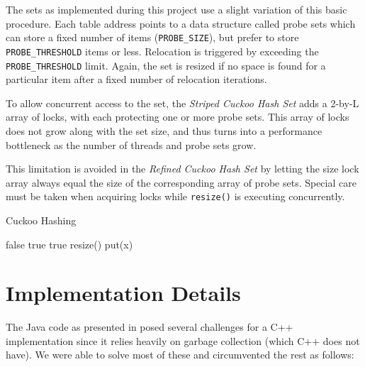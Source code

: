 \documentclass[a4paper,10pt]{article}
\begin{document}
The sets as implemented during this project use a slight variation of this
basic procedure. Each table address points to a data structure called probe sets
which can store a fixed number of items (\lstinline|PROBE_SIZE|), but prefer
to store \lstinline|PROBE_THRESHOLD| items or less. Relocation is triggered
by exceeding the \lstinline|PROBE_THRESHOLD| limit. Again, the set is resized
if no space is found for a particular item after a fixed number of relocation
iterations.

To allow concurrent access to the set, the \emph{Striped Cuckoo Hash Set}
adds a 2-by-L array of locks, with each protecting one or more probe sets.
This array of locks does not grow along with the set size, and thus turns into
a performance bottleneck as the number of threads and probe sets grow.

This limitation is avoided in the \emph{Refined Cuckoo Hash Set} by letting
the size lock array always equal the size of the corresponding array of probe
sets. Special care must be taken when acquiring locks while
\lstinline|resize()| is executing concurrently.

\begin{algorithm}
\caption{Cuckoo Hashing}
\label{alg:cuckooHashing}
\begin{algorithmic}[5]
		\State \Return false
	\EndIf
			\State \Return true
			\State \Return true
		\EndIf
	\EndFor
	\State resize()
	\State put(x)
\EndFunction
\end{algorithmic}
\end{algorithm}

\section{Implementation Details}
\label{sec:implDetails}

The Java code as presented in \cite{herlihy} posed several challenges for
a C++ implementation since it relies heavily on garbage collection (which C++
does not have). We were able to solve most of these and circumvented the rest
as follows:
\end{document}

